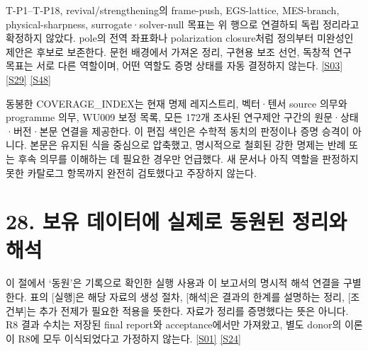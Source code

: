 \documentclass[11pt,a4paper]{article}
\begin{document}
T-P1–T-P18, revival/strengthening의 frame-push, EGS-lattice, MES-branch, physical-sharpness, surrogate·solver-null 목표는 위 행으로 연결하되 독립 정리라고 확정하지 않았다. pole의 전역 좌표화나 polarization closure처럼 정의부터 미완성인 제안은 후보로 보존한다. 문헌 배경에서 가져온 정리, 구현용 보조 선언, 독창적 연구 목표는 서로 다른 역할이며, 어떤 역할도 증명 상태를 자동 결정하지 않는다. \hyperlink{src:S03}{[S03]} \hyperlink{src:S29}{[S29]} \hyperlink{src:S48}{[S48]}


동봉한 COVERAGE\_INDEX는 현재 명제 레지스트리, 벡터·텐서 source 의무와 programme 의무, WU009 보정 목록, 모든 172개 조사된 연구제안 구간의 원문·상태·버전·본문 연결을 제공한다. 이 편집 색인은 수학적 동치의 판정이나 증명 승격이 아니다. 본문은 유지된 식을 중심으로 압축했고, 명시적으로 철회된 강한 명제는 반례 또는 후속 의무를 이해하는 데 필요한 경우만 언급했다. 새 문서나 아직 역할을 판정하지 못한 카탈로그 항목까지 완전히 검토했다고 주장하지 않는다.


\hypertarget{s28}{}

\section*{28. 보유 데이터에 실제로 동원된 정리와 해석}


이 절에서 ‘동원’은 기록으로 확인한 실행 사용과 이 보고서의 명시적 해석 연결을 구별한다. 표의 [실행]은 해당 자료의 생성 절차, [해석]은 결과의 한계를 설명하는 정리, [조건부]는 추가 전제가 필요한 적용을 뜻한다. 자료가 정리를 증명했다는 뜻은 아니다. R8 결과 수치는 저장된 final report와 acceptance에서만 가져왔고, 별도 donor의 이론이 R8에 모두 이식되었다고 가정하지 않는다. \hyperlink{src:S01}{[S01]} \hyperlink{src:S24}{[S24]}
\end{document}
